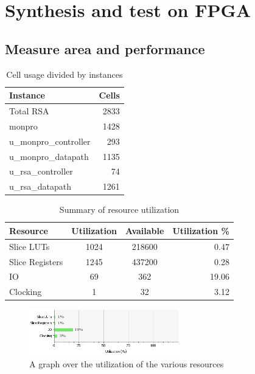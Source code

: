\section{Synthesis and test on FPGA}
\subsection{Measure area and performance}
%
\begin{table}[htp]
    \begin{center}
        \begin{tabular}{l | r}
            Instance                     & Cells \\
            \hline
            Total RSA                    & 2833 \\
            \quad monpro                 & 1428 \\
            \qquad u\_monpro\_controller & 293  \\
            \qquad u\_monpro\_datapath   & 1135 \\
            \quad u\_rsa\_controller     & 74   \\
            \quad u\_rsa\_datapath       & 1261 \\
        \end{tabular}
        \caption{Cell usage divided by instances}
        \label{tab:cell_usage}
    \end{center}
\end{table}
%
\begin{table}[htp]
    \begin{center}  
        \begin{tabular}{ l | c | c | r}
             Resource & Utilization & Available & Utilization \%  \\
             \hline
             Slice LUTs & 1024 & 218600 & 0.47 \\
             Slice Registers & 1245 & 437200 & 0.28 \\
             IO & 69 & 362 & 19.06 \\
             Clocking & 1 & 32 & 3.12 \\
        \end{tabular}
        \caption{Summary of resource utilization }
        \label{tab:resource_utilization}
    \end{center}
\end{table}
%
\begin{figure}[htp]
    \centering
    \includegraphics[width=0.6\textwidth]{images/utilization}
    \caption{A graph over the utilization of the various resources}
    \label{fig:utilization}
\end{figure}

